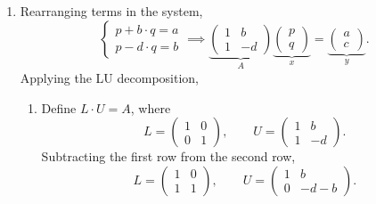 \begin{enumerate}
\item Rearranging terms in the system,
		\begin{equation}
        	\begin{cases}
        		p+b\cdot q=a\\
        		p-d\cdot q=b
        	\end{cases}\implies
        	\underbrace{
            	\begin{pmatrix}
            		1	&	b\\
            		1	&	-d
            	\end{pmatrix}
        	}_{A}
        	\underbrace{
            	\begin{pmatrix}
            		p	\\	q
            	\end{pmatrix}
        	}_{x}=
        	\underbrace{
            	\begin{pmatrix}
            		a	\\	c
            	\end{pmatrix}
        	}_{y}.
        \end{equation}
      Applying the LU decomposition,
		\begin{enumerate}
        	\item Define $L\cdot U=A$, where
                      \begin{equation}
                      	L=
                		\begin{pmatrix}
                			1&0\\0&1
                		\end{pmatrix},\qquad
                		U=
                		\begin{pmatrix}
                			1&b\\1&-d
                		\end{pmatrix}.
                      \end{equation}
        		    Subtracting the first row from the second row,
            		  \begin{equation}
                      	L=
                		\begin{pmatrix}
                			1&0\\1&1
                		\end{pmatrix},\qquad
                		U=
                		\begin{pmatrix}
                			1&b\\0&-d-b
                		\end{pmatrix}.
                      \end{equation}

\end{enumerate}
\end{enumerate}
